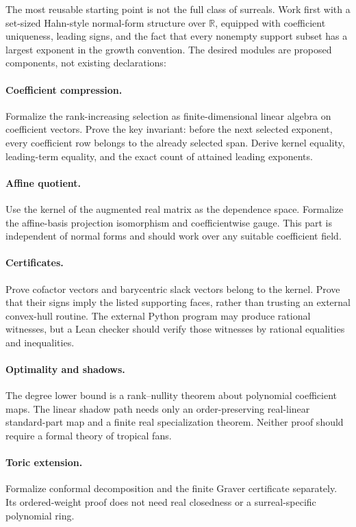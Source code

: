 \documentclass[11pt,a4paper]{article}
\numberwithin{equation}{section}
\theoremstyle{plain}
\newcommand{\R}{\mathbb R}
\begin{document}
The most reusable starting point is not the full class of surreals. Work
first with a set-sized Hahn-style normal-form structure over $\R$, equipped
with coefficient uniqueness, leading signs, and the fact that every
nonempty support subset has a largest exponent in the growth convention.
The desired modules are proposed components, not existing declarations:

\paragraph{Coefficient compression.}
Formalize the rank-increasing selection as finite-dimensional linear
algebra on coefficient vectors. Prove the key invariant: before the next
selected exponent, every coefficient row belongs to the already selected
span. Derive kernel equality, leading-term equality, and the exact count
of attained leading exponents.

\paragraph{Affine quotient.}
Use the kernel of the augmented real matrix as the dependence space.
Formalize the affine-basis projection isomorphism and coefficientwise gauge.
This part is independent of normal forms and should work over any suitable
coefficient field.

\paragraph{Certificates.}
Prove cofactor vectors and barycentric slack vectors belong to the kernel.
Prove that their signs imply the listed supporting faces, rather than
trusting an external convex-hull routine. The external Python program may
produce rational witnesses, but a Lean checker should verify those
witnesses by rational equalities and inequalities.

\paragraph{Optimality and shadows.}
The degree lower bound is a rank--nullity theorem about polynomial
coefficient maps. The linear shadow path needs only an order-preserving
real-linear standard-part map and a finite real specialization theorem.
Neither proof should require a formal theory of tropical fans.

\paragraph{Toric extension.}
Formalize conformal decomposition and the finite Graver certificate
separately. Its ordered-weight proof does not need real closedness or a
surreal-specific polynomial ring.
\end{document}
